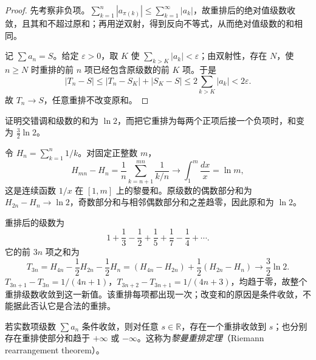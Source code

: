 \documentclass[UTF8,12pt,a4paper,fontset=fandol]{ctexbook}
\begin{document}
\begin{proof}
先考察非负项。$\sum_{k=1}^n|a_{\pi(k)}|\leq\sum_{k=1}^{\infty}|a_k|$，故重排后的绝对值级数收敛，且其和不超过原和；再用逆双射，得到反向不等式，从而绝对值级数的和相同。

记 $\sum a_n=S$。给定 $\varepsilon>0$，取 $K$ 使 $\sum_{k>K}|a_k|<\varepsilon$；由双射性，存在 $N$，使 $n\geq N$ 时重排的前 $n$ 项已经包含原级数的前 $K$ 项。于是
\[
    |T_n-S|
    \leq|T_n-S_K|+|S_K-S|
    \leq2\sum_{k>K}|a_k|<2\varepsilon.
\]
故 $T_n\to S$，任意重排不改变原和。
\end{proof}

\begin{example}
\label{ex:alternating-harmonic-rearrangement}
证明交错调和级数的和为 $\ln2$，而把它重排为每两个正项后接一个负项时，和变为 $\frac32\ln2$。
\end{example}

\begin{solve}
令 $H_n=\sum_{k=1}^n1/k$。对固定正整数 $m$，
\[
    H_{mn}-H_n=\frac1n\sum_{k=n+1}^{mn}\frac1{k/n}
       \longrightarrow\int_1^m\frac{dx}{x}=\ln m,
\]
这是连续函数 $1/x$ 在 $[1,m]$ 上的黎曼和。原级数的偶数部分和为 $H_{2n}-H_n\to\ln2$，奇数部分和与相邻偶数部分和之差趋零，因此原和为 $\ln2$。

重排后的级数为
\[
    1+\frac13-\frac12+\frac15+\frac17-\frac14+\cdots.
\]
它的前 $3n$ 项之和为
\[
    T_{3n}=H_{4n}-\frac12H_{2n}-\frac12H_n
          =(H_{4n}-H_{2n})+\frac12(H_{2n}-H_n)
          \longrightarrow\frac32\ln2.
\]
$T_{3n+1}-T_{3n}=1/(4n+1)$，$T_{3n+2}-T_{3n+1}=1/(4n+3)$，均趋于零，故整个重排级数收敛到这一新值。该重排每项都出现一次；改变和的原因是条件收敛，不能据此否认它是合法的重排。
\end{solve}

\begin{theorem}[黎曼重排定理]
\label{thm:riemann-rearrangement}
若实数项级数 $\sum a_n$ 条件收敛，则对任意 $s\in\mathbb R$，存在一个重排收敛到 $s$；也分别存在重排使部分和趋于 $+\infty$ 或 $-\infty$。这称为\emph{黎曼重排定理}（Riemann rearrangement theorem）。
\end{theorem}
\end{document}
